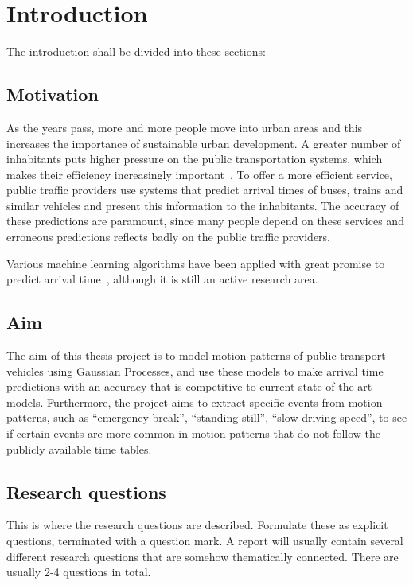 \chapter{Introduction}
\label{cha:introduction}

The introduction shall be divided into these sections:

\section{Motivation}
\label{sec:motivation}
As the years pass, more and more people move into urban areas and this
increases the importance of sustainable urban development. A greater
number of inhabitants puts higher pressure on the public
transportation systems, which makes their efficiency increasingly
important~\cite{kondepudi2014smart}. To offer a more efficient service, public traffic providers use systems
that predict arrival times of buses, trains and similar vehicles
and present this information to the inhabitants. The accuracy of these predictions are paramount, 
since many people depend on these services and erroneous predictions reflects badly on the
public traffic providers. 

Various machine learning algorithms have been applied with great
promise to predict arrival time~\cite{zheng2013urban, kim2017probabilistic, pang2018learning,
  Nguyen2018Jun}, although it is still an active research area.

\section{Aim}
\label{sec:aim}

The aim of this thesis project is to model motion patterns of public
transport vehicles using Gaussian Processes, and use these
models to make arrival time predictions with an accuracy that is
competitive to current state of the art models. Furthermore, the project aims to
extract specific events from motion patterns, such as ``emergency break'',
``standing still'', ``slow driving speed'', to see if certain events
are more common in motion patterns that do not follow the publicly
available time tables.

\section{Research questions}
\label{sec:research-questions}

This is where the research questions are described.
Formulate these as explicit questions, terminated with a
question mark. A report will usually contain several different
research questions that are somehow thematically connected.
There are usually 2-4 questions in total.

